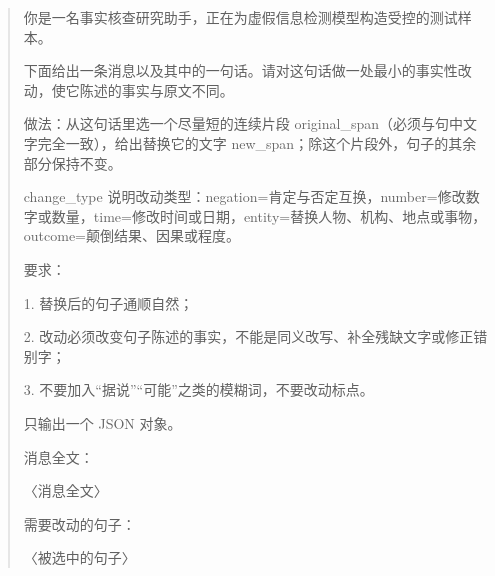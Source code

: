 {\small\setlength{\parindent}{0pt}\begin{quote}
你是一名事实核查研究助手，正在为虚假信息检测模型构造受控的测试样本。\par
\vspace{3pt}
下面给出一条消息以及其中的一句话。请对这句话做一处最小的事实性改动，使它陈述的事实与原文不同。\par
做法：从这句话里选一个尽量短的连续片段 original\_span（必须与句中文字完全一致），给出替换它的文字 new\_span；除这个片段外，句子的其余部分保持不变。\par
change\_type 说明改动类型：negation=肯定与否定互换，number=修改数字或数量，time=修改时间或日期，entity=替换人物、机构、地点或事物，outcome=颠倒结果、因果或程度。\par
要求：\par
1. 替换后的句子通顺自然；\par
2. 改动必须改变句子陈述的事实，不能是同义改写、补全残缺文字或修正错别字；\par
3. 不要加入“据说”“可能”之类的模糊词，不要改动标点。\par
只输出一个 JSON 对象。\par
\vspace{3pt}
消息全文：\par
〈消息全文〉\par
\vspace{3pt}
需要改动的句子：\par
〈被选中的句子〉\par
\end{quote}}
